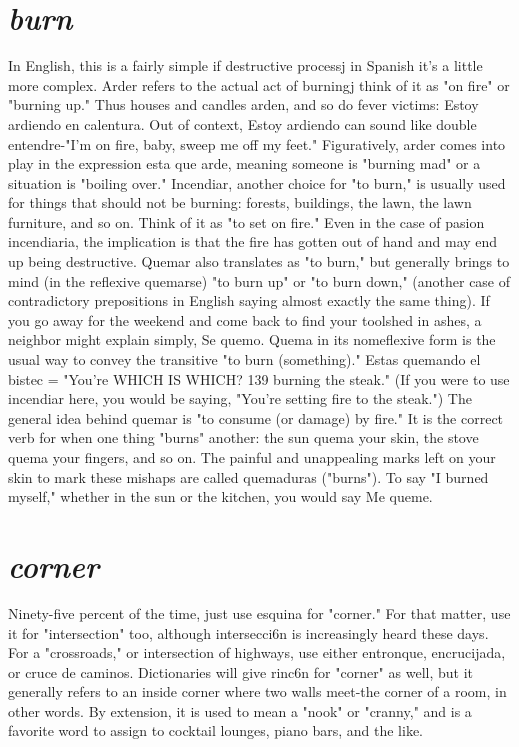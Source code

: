 \documentclass[14pt,a4paper,oneside]{memoir}
\begin{document}
\section{\emph{burn}}

In English, this is a fairly simple if destructive processj in
Spanish it's a little more complex. Arder refers to the actual act of
burningj think of it as "on fire" or "burning up." Thus houses and
candles arden, and so do fever victims: Estoy ardiendo en calentura.
Out of context, Estoy ardiendo can sound like double entendre-"I'm
on fire, baby, sweep me off my feet." Figuratively, arder comes into
play in the expression esta que arde, meaning someone is "burning
mad" or a situation is "boiling over."
Incendiar, another choice for "to burn," is usually used for
things that should not be burning: forests, buildings, the lawn, the
lawn furniture, and so on. Think of it as "to set on fire." Even in the
case of pasion incendiaria, the implication is that the fire has gotten
out of hand and may end up being destructive.
Quemar also translates as "to burn," but generally brings to
mind (in the reflexive quemarse) "to burn up" or "to burn down," (another case of contradictory prepositions in English saying almost exactly the same thing). If you go away for the weekend and come back
to find your toolshed in ashes, a neighbor might explain simply, Se
quemo. Quema in its nomeflexive form is the usual way to convey the
transitive "to burn (something)." Estas quemando el bistec = "You're
WHICH IS WHICH? 139
burning the steak." (If you were to use incendiar here, you would be
saying, "You're setting fire to the steak.") The general idea behind quemar is "to consume (or damage) by fire." It is the correct verb for when
one thing "burns" another: the sun quema your skin, the stove quema
your fingers, and so on. The painful and unappealing marks left on
your skin to mark these mishaps are called quemaduras ("burns"). To
say "I burned myself," whether in the sun or the kitchen, you would
say Me queme.

\section{\emph{corner}}

Ninety-five percent of the time, just use esquina for "corner."
For that matter, use it for "intersection" too, although intersecci6n
is increasingly heard these days. For a "crossroads," or intersection
of highways, use either entronque, encrucijada, or cruce de caminos.
Dictionaries will give rinc6n for "corner" as well, but it generally refers to an inside corner where two walls meet-the corner of a room,
in other words. By extension, it is used to mean a "nook" or "cranny,"
and is a favorite word to assign to cocktail lounges, piano bars, and
the like.
\end{document}
